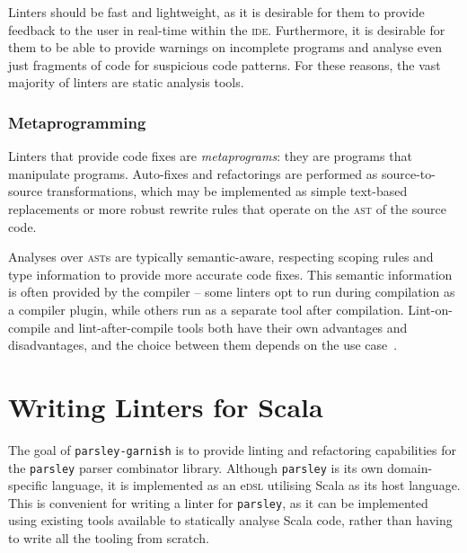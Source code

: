 \documentclass[../../main.tex]{subfiles}
\begin{document}
Linters should be fast and lightweight, as it is desirable for them to provide feedback to the user in real-time within the \textsc{ide}.
Furthermore, it is desirable for them to be able to provide warnings on incomplete programs and analyse even just fragments of code for suspicious code patterns.
For these reasons, the vast majority of linters are static analysis tools.


\subsubsection{Metaprogramming}
Linters that provide code fixes are \emph{metaprograms}: they are programs that manipulate programs.
Auto-fixes and refactorings are performed as source-to-source transformations, which may be implemented as simple text-based replacements or more robust rewrite rules that operate on the \textsc{ast} of the source code.

Analyses over \textsc{ast}s are typically semantic-aware, respecting scoping rules and type information to provide more accurate code fixes.
This semantic information is often provided by the compiler -- some linters opt to run during compilation as a compiler plugin, while others run as a separate tool after compilation.
Lint-on-compile and lint-after-compile tools both have their own advantages and disadvantages, and the choice between them depends on the use case~\cite{sadowski_analysis-google_2018}.

\section{Writing Linters for Scala}\label{sec:writing-scala-linters}
The goal of \texttt{parsley-garnish} is to provide linting and refactoring capabilities for the \texttt{parsley} parser combinator library.
Although \texttt{parsley} is its own domain-specific language, it is implemented as an e\textsc{dsl} utilising Scala as its host language.
This is convenient for writing a linter for \texttt{parsley}, as it can be implemented using existing tools available to statically analyse Scala code, rather than having to write all the tooling from scratch.
\end{document}
